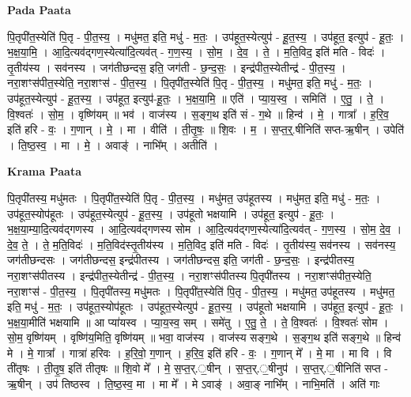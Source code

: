 \documentclass[17pt]{extarticle}
\begin{document}
\textbf{Pada Paata} \newline

पि॒तृपी॑त॒स्येति॑ पि॒तृ - पी॒त॒स्य॒ । मधु॑मत॒ इति॒ मधु॑ - म॒तः॒ । उप॑हूत॒स्येत्युप॑ - हू॒त॒स्य॒ । उप॑हूत॒ इत्युप॑ - हू॒तः॒ । भ॒क्ष॒या॒मि॒ । आ॒दि॒त्यव॑द्गण॒स्येत्या॑दि॒त्यव॑त् - ग॒ण॒स्य॒ । सो॒म॒ । दे॒व॒ । ते॒ । म॒ति॒विद॒ इति॑ मति - विदः॑ । तृ॒तीय॑स्य । सव॑नस्य । जग॑तीछन्दस॒ इति॒ जग॑ती - छ॒न्द॒सः॒ । इन्द्र॑पीत॒स्येतीन्द्र॑ - पी॒त॒स्य॒ । नरा॒शꣳस॑पीत॒स्येति॒ नरा॒शꣳस॑ - पी॒त॒स्य॒ । पि॒तृपी॑त॒स्येति॑ पि॒तृ - पी॒त॒स्य॒ । मधु॑मत॒ इति॒ मधु॑ - म॒तः॒ । उप॑हूत॒स्येत्युप॑ - हू॒त॒स्य॒ । उप॑हूत॒ इत्युप॑-हू॒तः॒ । भ॒क्ष॒या॒मि॒ ॥ एति॑ । प्या॒य॒स्व॒ । समिति॑ । ए॒तु॒ । ते॒ । वि॒श्वतः॑ । सो॒म॒ । वृष्णि॑यम् ॥ भव॑ । वाज॑स्य । स॒ङ्ग॒थ इति॑ सं - ग॒थे ॥ हिन्व॑ । मे॒ । गात्रा᳚ । ह॒रि॒व॒ इति॑ हरि - वः॒ । ग॒णान् । मे॒ । मा । वीति॑ । ती॒तृ॒षः॒ ॥ शि॒वः । म॒ । स॒प्त॒र्॒.षीनिति॑ सप्त-ऋ॒षीन् । उपेति॑ । ति॒ष्ठ॒स्व॒ । मा । मे॒ । अवाङ्॑ । नाभि᳚म् । अतीति॑ ।  \newline


\textbf{Krama Paata} \newline

पि॒तृपी॑तस्य॒ मधु॑मतः । पि॒तृपी॑त॒स्येति॑ पि॒तृ - पी॒त॒स्य॒ । मधु॑मत॒ उप॑हूतस्य । मधु॑मत॒ इति॒ मधु॑ - म॒तः॒ । उप॑हूत॒स्योप॑हूतः । उप॑हूत॒स्येत्युप॑ - हू॒त॒स्य॒ । उप॑हूतो भक्षयामि । उप॑हूत॒ इत्युप॑ - हू॒तः॒ । भ॒क्ष॒या॒म्या॒दि॒त्यव॑द्गणस्य । आ॒दि॒त्यव॑द्गणस्य सोम । आ॒दि॒त्यव॑द्गण॒स्येत्या॑दि॒त्यव॑त् - ग॒ण॒स्य॒ । सो॒म॒ दे॒व॒ । दे॒व॒ ते॒ । ते॒ म॒ति॒विदः॑ । म॒ति॒विद॑स्तृ॒तीय॑स्य । म॒ति॒विद॒ इति॑ मति - विदः॑ । तृ॒तीय॑स्य॒ सव॑नस्य । सव॑नस्य॒ जग॑तीछन्दसः । जग॑तीछन्दस॒ इन्द्र॑पीतस्य । जग॑तीछन्दस॒ इति॒ जग॑ती - छ॒न्द॒सः॒ । इन्द्र॑पीतस्य॒ नरा॒शꣳस॑पीतस्य । इन्द्र॑पीत॒स्येतीन्द्र॑ - पी॒त॒स्य॒ । नरा॒शꣳस॑पीतस्य पि॒तृपी॑तस्य । नरा॒शꣳस॑पीत॒स्येति॒ नरा॒शꣳस॑ - पी॒त॒स्य॒ । पि॒तृपी॑तस्य॒ मधु॑मतः । पि॒तृपी॑त॒स्येति॑ पि॒तृ - पी॒त॒स्य॒ । मधु॑मत॒ उप॑हूतस्य । मधु॑मत॒ इति॒ मधु॑ - म॒तः॒ । उप॑हूत॒स्योप॑हूतः । उप॑हूत॒स्येत्युप॑ - हू॒त॒स्य॒ । उप॑हूतो भक्षयामि । उप॑हूत॒ इत्युप॑ - हू॒तः॒ । भ॒क्ष॒या॒मीति॑ भक्षयामि ॥ आ प्या॑यस्व । प्या॒य॒स्व॒ सम् । समे॑तु । ए॒तु॒ ते॒ । ते॒ वि॒श्वतः॑ । वि॒श्वतः॑ सोम । सो॒म॒ वृष्णि॑यम् । वृष्णि॑य॒मिति॒ वृष्णि॑यम् ॥ भवा॒ वाज॑स्य । वाज॑स्य सङ्ग॒थे । स॒ङ्ग॒थ इति॑ सङ्ग॒थे ॥ हिन्व॑ मे । मे॒ गात्रा᳚ । गात्रा॑ हरिवः । ह॒रि॒वो॒ ग॒णान् । ह॒रि॒व॒ इति॑ हरि - वः॒ । ग॒णान् मे᳚ । मे॒ मा । मा वि । वि ती॑तृषः । ती॒तृ॒ष॒ इति॑ तीतृषः ॥ शि॒वो मे᳚ । मे॒ स॒प्त॒र्.॒षीन् । स॒प्त॒र्.॒षीनुप॑ । स॒प्त॒र्.॒षीनिति॑ सप्त - ऋ॒षीन् । उप॑ तिष्ठस्व । ति॒ष्ठ॒स्व॒ मा । मा मे᳚ । मे ऽवाङ्॑ । अवा॒ङ् नाभि᳚म् । नाभि॒मति॑ । अति॑ गाः \newline
\end{document}
